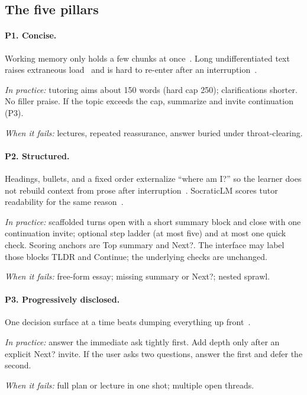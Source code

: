 \subsection{The five pillars}
\label{sec:pillars}

\paragraph{P1. Concise.}
Working memory only holds a few chunks at once~\cite{cowan2010magical}. Long
undifferentiated text raises extraneous load~\cite{sweller2011cognitive} and
is hard to re-enter after an interruption~\cite{zhu2026scaffolding}.

\emph{In practice:} tutoring aims about 150 words (hard cap 250); clarifications
shorter. No filler praise. If the topic exceeds the cap, summarize and invite
continuation (P3).

\emph{When it fails:} lectures, repeated reassurance, answer buried under
throat-clearing.

\paragraph{P2. Structured.}
Headings, bullets, and a fixed order externalize ``where am I?'' so the
learner does not rebuild context from prose after
interruption~\cite{w3c2021coga,barkley1997behavioral}. SocraticLM scores tutor
readability for the same reason~\cite{liu2024socraticlm}.

\emph{In practice:} scaffolded turns open with a short summary block and close
with one continuation invite; optional step ladder (at most five) and at most
one quick check. Scoring anchors are Top summary and Next?. The interface may
label those blocks TLDR and Continue; the underlying checks are unchanged.

\emph{When it fails:} free-form essay; missing summary or Next?; nested
sprawl.

\paragraph{P3. Progressively disclosed.}
One decision surface at a time beats dumping everything up
front~\cite{saha2023can,zhu2026scaffolding}.

\emph{In practice:} answer the immediate ask tightly first. Add depth only
after an explicit Next? invite. If the user asks two questions, answer the
first and defer the second.

\emph{When it fails:} full plan or lecture in one shot; multiple open threads.

